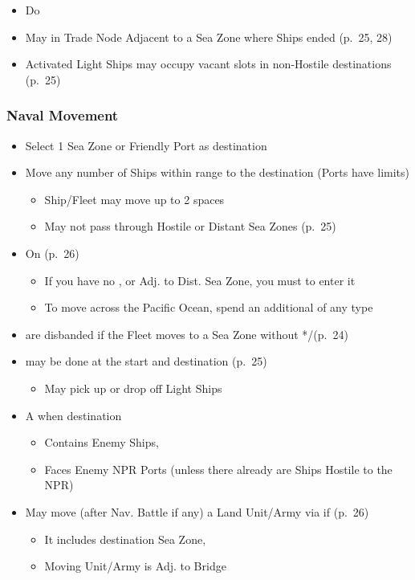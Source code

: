 \documentclass[10pt]{article}
\begin{document}
\begin{itemize}
	\item Do   
	\item May  in Trade Node Adjacent to a Sea Zone where Ships ended  (p.~25, 28)
	\item Activated Light Ships may occupy vacant  slots in non-Hostile destinations (p.~25)
\end{itemize}

\subsubsection*{Naval Movement}
\begin{itemize}
	\item Select 1 Sea Zone or Friendly Port as destination
	\item Move any number of Ships within range to the destination (Ports have limits)
	\begin{itemize}
		\item Ship/Fleet may move up to 2 spaces
		\item May not pass through Hostile or Distant Sea Zones (p.~25)
	\end{itemize}
	\item On  (p.~26)
	\begin{itemize}
		\item If you have no \claim, \town or \vassal Adj. to Dist. Sea Zone, you must  to enter it
		\item To move across the Pacific Ocean, spend an additional \monarchpower of any type
	\end{itemize}
	\item {} are disbanded if the Fleet moves to a Sea Zone without */\textdagger\xspace(p.~24)
	\item {} may be done at the start and destination (p.~25)
	\begin{itemize}
		\item May pick up or drop off Light Ships
	\end{itemize}
	\item A  when destination
	\begin{itemize}
		\item Contains Enemy Ships, 
		\item Faces Enemy NPR Ports (unless there already are Ships Hostile to the NPR)
	\end{itemize}
	\item {}May move (after Nav. Battle if any) a Land Unit/Army via  if (p.~26)
	\begin{itemize}
		\item It includes destination Sea Zone, 
		\item Moving Unit/Army is Adj. to Bridge
	\end{itemize}
\end{itemize}
\end{document}

